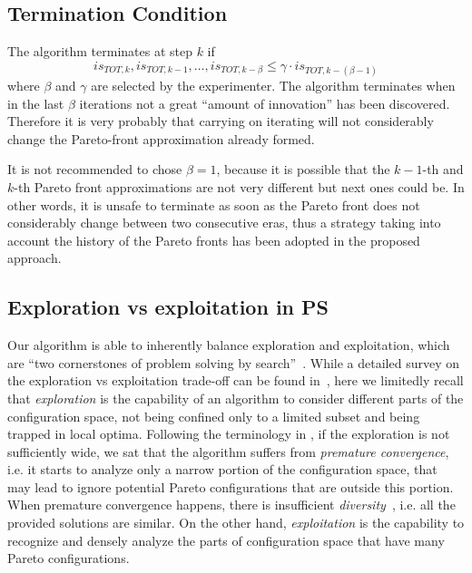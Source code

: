 \subsection{Termination Condition}
The algorithm terminates at step $k$ if
\[
is_{TOT,k},is_{TOT,k-1},\dots,is_{TOT,k-\beta}\le\gamma\cdot is_{TOT,k-\left(\beta-1\right)}
\]
 where $\beta$ and $\gamma$ are selected by the experimenter. 
The algorithm terminates when in the last
$\beta$ iterations not a great ``amount of innovation'' has been
discovered. Therefore it is very probably that carrying on iterating
will not considerably change the Pareto-front approximation already formed. 

It is not recommended to chose $\beta=1$, because it is possible that the
$k-1$-th and $k$-th Pareto front approximations are not very different but next ones could be. In other words,
it is unsafe to terminate as soon as the Pareto front does not considerably change
between two consecutive eras, thus a strategy taking into
account the history of the Pareto fronts has been adopted in the
proposed approach.

\subsection{Exploration vs exploitation in PS}
Our algorithm is able to inherently balance exploration and exploitation, which are ``two cornerstones of problem solving by search''~\cite{eiben1998evolutionary}. While a detailed survey on the exploration vs exploitation trade-off can be found in~\cite{vcrepinvsek2013exploration}, here we limitedly recall that \emph{exploration} is the capability of an algorithm to consider different parts of the configuration space, not being confined only to a limited subset and being trapped in local optima. Following the terminology in \cite{weise2012evolutionary}, if the exploration is not sufficiently wide, we sat that the algorithm suffers from \emph{premature convergence}, i.e. it starts to analyze only a narrow portion of the configuration space, that may lead to ignore potential Pareto configurations that are outside this portion. When premature convergence happens, there is insufficient \emph{diversity}~\cite{weise2012evolutionary}, i.e. all the provided solutions are similar.
On the other hand, \emph{exploitation} is the capability to recognize and densely analyze the parts of configuration space that have many Pareto configurations.

